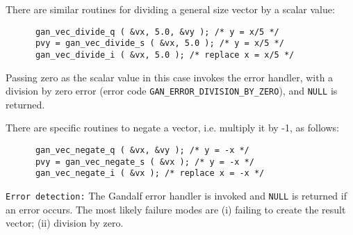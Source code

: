 There are similar routines for dividing a general size vector by a scalar
value:
\begin{verbatim}
      gan_vec_divide_q ( &vx, 5.0, &vy ); /* y = x/5 */
      pvy = gan_vec_divide_s ( &vx, 5.0 ); /* y = x/5 */
      gan_vec_divide_i ( &vx, 5.0 ); /* replace x = x/5 */
\end{verbatim}
Passing zero as the scalar value in this case invokes the error handler,
with a division by zero error
(error code {\tt GAN\_ERROR\_DIVISION\_BY\_ZERO}),
and {\tt NULL} is returned.

There are specific routines to negate a vector, i.e. multiply it by -1,
as follows:
\begin{verbatim}
      gan_vec_negate_q ( &vx, &vy ); /* y = -x */
      pvy = gan_vec_negate_s ( &vx ); /* y = -x */
      gan_vec_negate_i ( &vx ); /* replace x = -x */
\end{verbatim}

{\tt Error detection:} The Gandalf error handler is invoked and {\tt NULL}
is returned if an error occurs. The most likely failure modes are
(i) failing to create the result vector; (ii) division by zero.


